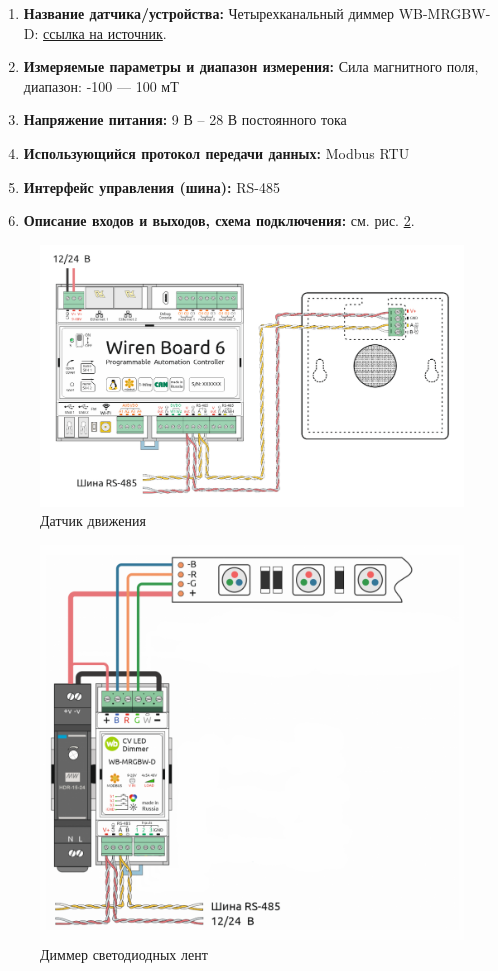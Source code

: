 \documentclass[a4paper,14pt]{extarticle}
\begin{document}
\begin{enumerate}
	\item \textbf{Название датчика/устройства:}  Четырехканальный диммер WB-MRGBW-D: \href{https://wirenboard.com/ru/product/WB-MRGBW-D/}{ссылка на источник}.
	

	
	\item  \textbf{Измеряемые параметры и диапазон измерения:} Сила магнитного поля, диапазон: -100 --- 100 мТ
	
	\item  \textbf{Напряжение питания:} 9 В – 28 В постоянного тока
	
	\item  \textbf{Использующийся протокол передачи данных:} Modbus RTU
	
	\item  \textbf{Интерфейс управления (шина):} RS-485
	
	\item  \textbf{Описание входов и выходов, схема подключения:} см. рис. \ref{fig:device-5}.
\end{enumerate}


\begin{figure}[htpb]
	\centering
	\includegraphics[width=0.5\linewidth]{images/device-4}
	\caption{Датчик движения}
	\label{fig:device-4}
\end{figure}

\begin{figure}[htpb]
	\centering
	\includegraphics[width=0.5\linewidth]{images/device-5}
	\caption{Диммер светодиодных лент }
	\label{fig:device-5}
\end{figure}
\end{document}
